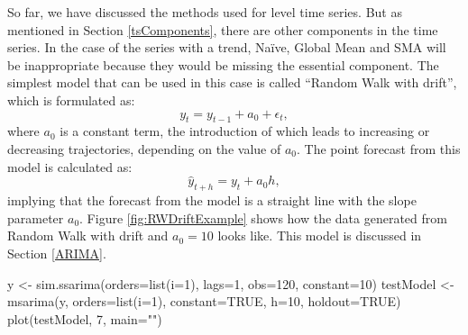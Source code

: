 \documentclass[
]{book}
\newenvironment{Shaded}{\begin{snugshade}}{\end{snugshade}}
\newcommand{\AttributeTok}[1]{\textcolor[rgb]{0.77,0.63,0.00}{#1}}
\newcommand{\ConstantTok}[1]{\textcolor[rgb]{0.00,0.00,0.00}{#1}}
\newcommand{\DecValTok}[1]{\textcolor[rgb]{0.00,0.00,0.81}{#1}}
\newcommand{\FunctionTok}[1]{\textcolor[rgb]{0.00,0.00,0.00}{#1}}
\newcommand{\NormalTok}[1]{#1}
\newcommand{\OtherTok}[1]{\textcolor[rgb]{0.56,0.35,0.01}{#1}}
\newcommand{\StringTok}[1]{\textcolor[rgb]{0.31,0.60,0.02}{#1}}
\theoremstyle{definition}
\theoremstyle{definition}
\theoremstyle{definition}
\theoremstyle{definition}
\theoremstyle{remark}
\begin{document}
So far, we have discussed the methods used for level time series. But as mentioned in Section \ref{tsComponents}, there are other components in the time series. In the case of the series with a trend, Naïve, Global Mean and SMA will be inappropriate because they would be missing the essential component. The simplest model that can be used in this case is called ``Random Walk with drift'', which is formulated as:
\begin{equation}
    y_t = y_{t-1} + a_0 + \epsilon_t,
    \label{eq:RandomWalkWithDrift}
\end{equation}
where \(a_0\) is a constant term, the introduction of which leads to increasing or decreasing trajectories, depending on the value of \(a_0\). The point forecast from this model is calculated as:
\begin{equation}
    \hat{y}_{t+h} = y_{t} + a_0 h,
    \label{eq:RandomWalkWithDriftForecast}
\end{equation}
implying that the forecast from the model is a straight line with the slope parameter \(a_0\). Figure \ref{fig:RWDriftExample} shows how the data generated from Random Walk with drift and \(a_0=10\) looks like. This model is discussed in Section \ref{ARIMA}.

\begin{Shaded}
\begin{Highlighting}[]
\NormalTok{y }\OtherTok{\textless{}{-}} \FunctionTok{sim.ssarima}\NormalTok{(}\AttributeTok{orders=}\FunctionTok{list}\NormalTok{(}\AttributeTok{i=}\DecValTok{1}\NormalTok{), }\AttributeTok{lags=}\DecValTok{1}\NormalTok{, }\AttributeTok{obs=}\DecValTok{120}\NormalTok{,}
                 \AttributeTok{constant=}\DecValTok{10}\NormalTok{)}
\NormalTok{testModel }\OtherTok{\textless{}{-}} \FunctionTok{msarima}\NormalTok{(y, }\AttributeTok{orders=}\FunctionTok{list}\NormalTok{(}\AttributeTok{i=}\DecValTok{1}\NormalTok{), }\AttributeTok{constant=}\ConstantTok{TRUE}\NormalTok{,}
                     \AttributeTok{h=}\DecValTok{10}\NormalTok{, }\AttributeTok{holdout=}\ConstantTok{TRUE}\NormalTok{)}
\FunctionTok{plot}\NormalTok{(testModel, }\DecValTok{7}\NormalTok{, }\AttributeTok{main=}\StringTok{""}\NormalTok{)}
\end{Highlighting}
\end{Shaded}
\end{document}
